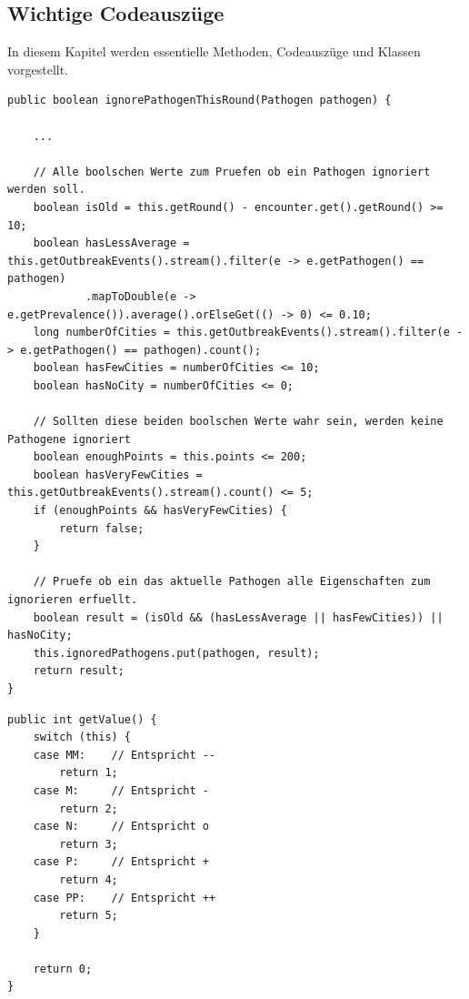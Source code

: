 \documentclass{article}
\newcommand{\gquote}[1]{\glqq #1\grqq} %
\let\oldgls\gls
\renewcommand{\gls}[1]{\emph{\oldgls{#1}}} %
\begin{document}
\subsection{Wichtige Codeauszüge}
\label{sec:CodeErklaerung}
In diesem Kapitel werden essentielle Methoden, Codeauszüge und Klassen vorgestellt.
\label{code:IgnorePathogen}
\begin{lstlisting}[title=Methode die entscheidet ob es sich bei einem Pathogen um ein \gls{ignoriertes Pathogen} handelt oder nicht.]
public boolean ignorePathogenThisRound(Pathogen pathogen) {

    ...
    
    // Alle boolschen Werte zum Pruefen ob ein Pathogen ignoriert werden soll.
	boolean isOld = this.getRound() - encounter.get().getRound() >= 10;
	boolean hasLessAverage = this.getOutbreakEvents().stream().filter(e -> e.getPathogen() == pathogen)
			.mapToDouble(e -> e.getPrevalence()).average().orElseGet(() -> 0) <= 0.10;
	long numberOfCities = this.getOutbreakEvents().stream().filter(e -> e.getPathogen() == pathogen).count();
	boolean hasFewCities = numberOfCities <= 10;
	boolean hasNoCity = numberOfCities <= 0;

    // Sollten diese beiden boolschen Werte wahr sein, werden keine Pathogene ignoriert
	boolean enoughPoints = this.points <= 200;
	boolean hasVeryFewCities = this.getOutbreakEvents().stream().count() <= 5;
	if (enoughPoints && hasVeryFewCities) {
		return false;
	}

    // Pruefe ob ein das aktuelle Pathogen alle Eigenschaften zum ignorieren erfuellt. 
	boolean result = (isOld && (hasLessAverage || hasFewCities)) || hasNoCity;
	this.ignoredPathogens.put(pathogen, result);
	return result;
}
\end{lstlisting}
\label{code:ScaleErklaerung}
\begin{lstlisting}[title=Numerische Repräsentation der Werte von z.B. \gquote{Infectivity} eines Pathogens]
public int getValue() {
	switch (this) {
	case MM:    // Entspricht --
		return 1;
	case M:     // Entspricht -
		return 2;
	case N:     // Entspricht o
		return 3;
	case P:     // Entspricht +
		return 4;
	case PP:    // Entspricht ++
		return 5;
	}

	return 0;
}
\end{lstlisting}
\label{code:DoQuarantine}
\newpage
\end{document}
